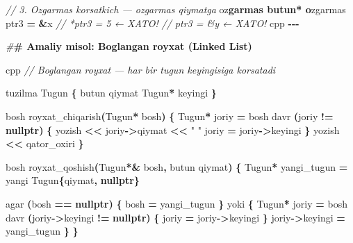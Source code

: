 \documentclass[a4paper,11pt,twoside,openright]{book}
\newenvironment{Shaded}{\begin{snugshade}}{\end{snugshade}}
\newcommand{\CharTok}[1]{\textcolor[rgb]{0.31,0.60,0.02}{#1}}
\newcommand{\CommentTok}[1]{\textcolor[rgb]{0.56,0.35,0.01}{\textit{#1}}}
\newcommand{\ErrorTok}[1]{\textcolor[rgb]{0.64,0.00,0.00}{\textbf{#1}}}
\newcommand{\KeywordTok}[1]{\textcolor[rgb]{0.13,0.29,0.53}{\textbf{#1}}}
\newcommand{\NormalTok}[1]{#1}
\newcommand{\OperatorTok}[1]{\textcolor[rgb]{0.81,0.36,0.00}{\textbf{#1}}}
\newcommand{\PreprocessorTok}[1]{\textcolor[rgb]{0.56,0.35,0.01}{\textit{#1}}}
\newcommand{\StringTok}[1]{\textcolor[rgb]{0.31,0.60,0.02}{#1}}
\begin{document}
\begin{Shaded}
\begin{Highlighting}[]
\CommentTok{// 3. O\textquotesingle{}zgarmas ko\textquotesingle{}rsatkich — o\textquotesingle{}zgarmas qiymatga}
\NormalTok{o}\CharTok{\textquotesingle{}z}\ErrorTok{garmas butun* o}\CharTok{\textquotesingle{}}\NormalTok{zgarmas ptr3 }\OperatorTok{=} \OperatorTok{\&}\NormalTok{x}
\CommentTok{// *ptr3 = 5    ← XATO!}
\CommentTok{// ptr3 = \&y    ← XATO!}
\ErrorTok{\textasciigrave{}\textasciigrave{}\textasciigrave{}}\NormalTok{cpp}
\OperatorTok{{-}{-}{-}}

\PreprocessorTok{\#}\ErrorTok{\# Amaliy misol: Bog\textquotesingle{}langan ro\textquotesingle{}yxat (Linked List)}

\ErrorTok{\textasciigrave{}\textasciigrave{}\textasciigrave{}}\NormalTok{cpp}
\CommentTok{// Bog\textquotesingle{}langan ro\textquotesingle{}yxat — har bir tugun keyingisiga ko\textquotesingle{}rsatadi}

\NormalTok{tuzilma Tugun }\OperatorTok{\{}
\NormalTok{    butun qiymat}
\NormalTok{    Tugun}\OperatorTok{*}\NormalTok{ keyingi}
\OperatorTok{\}}

\NormalTok{bosh royxat\_chiqarish}\OperatorTok{(}\NormalTok{Tugun}\OperatorTok{*}\NormalTok{ bosh}\OperatorTok{)} \OperatorTok{\{}
\NormalTok{    Tugun}\OperatorTok{*}\NormalTok{ joriy }\OperatorTok{=}\NormalTok{ bosh}
\NormalTok{    davr }\OperatorTok{(}\NormalTok{joriy }\OperatorTok{!=} \KeywordTok{nullptr}\OperatorTok{)} \OperatorTok{\{}
\NormalTok{        yozish }\OperatorTok{\textless{}\textless{}}\NormalTok{ joriy}\OperatorTok{{-}\textgreater{}}\NormalTok{qiymat }\OperatorTok{\textless{}\textless{}} \StringTok{" "}
\NormalTok{        joriy }\OperatorTok{=}\NormalTok{ joriy}\OperatorTok{{-}\textgreater{}}\NormalTok{keyingi}
    \OperatorTok{\}}
\NormalTok{    yozish }\OperatorTok{\textless{}\textless{}}\NormalTok{ qator\_oxiri}
\OperatorTok{\}}

\NormalTok{bosh royxat\_qoshish}\OperatorTok{(}\NormalTok{Tugun}\OperatorTok{*\&}\NormalTok{ bosh}\OperatorTok{,}\NormalTok{ butun qiymat}\OperatorTok{)} \OperatorTok{\{}
\NormalTok{    Tugun}\OperatorTok{*}\NormalTok{ yangi\_tugun }\OperatorTok{=}\NormalTok{ yangi Tugun}\OperatorTok{\{}\NormalTok{qiymat}\OperatorTok{,} \KeywordTok{nullptr}\OperatorTok{\}}

\NormalTok{    agar }\OperatorTok{(}\NormalTok{bosh }\OperatorTok{==} \KeywordTok{nullptr}\OperatorTok{)} \OperatorTok{\{}
\NormalTok{        bosh }\OperatorTok{=}\NormalTok{ yangi\_tugun}
    \OperatorTok{\}}\NormalTok{ yoki }\OperatorTok{\{}
\NormalTok{        Tugun}\OperatorTok{*}\NormalTok{ joriy }\OperatorTok{=}\NormalTok{ bosh}
\NormalTok{        davr }\OperatorTok{(}\NormalTok{joriy}\OperatorTok{{-}\textgreater{}}\NormalTok{keyingi }\OperatorTok{!=} \KeywordTok{nullptr}\OperatorTok{)} \OperatorTok{\{}
\NormalTok{            joriy }\OperatorTok{=}\NormalTok{ joriy}\OperatorTok{{-}\textgreater{}}\NormalTok{keyingi}
        \OperatorTok{\}}
\NormalTok{        joriy}\OperatorTok{{-}\textgreater{}}\NormalTok{keyingi }\OperatorTok{=}\NormalTok{ yangi\_tugun}
    \OperatorTok{\}}
\OperatorTok{\}}


\end{Highlighting}
\end{Shaded}
\end{document}
